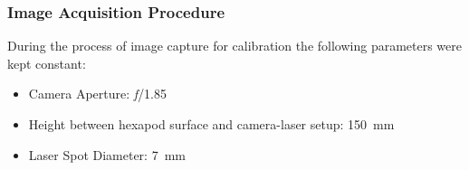 
            

    \subsubsection*{Image Acquisition Procedure}\label{subsubsection:image_acq_calib}
        During the process of image capture for calibration the following parameters were kept constant:
        \begin{itemize}
            \item Camera Aperture: \emph{f}/1.85
            \item Height between hexapod surface and camera-laser setup: \SI{150}{\milli\meter}
            \item Laser Spot Diameter: \SI{7}{\milli\meter}
        \end{itemize}
        
